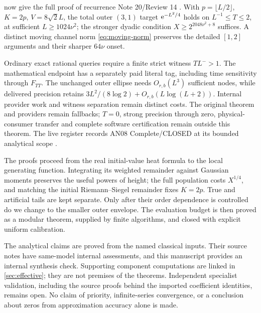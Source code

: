 \begin{remark}
\label{rem:moving-supplement}
 now give the full
proof of recurrence Note 20/Review 14 \cite{rec20,rec20review}. With
\(p=\lfloor L/2\rfloor\), \(K=2p\), \(V=8\sqrt2L\), the total
outer \((3,1)\) target \(\mathrm e^{-L^2/4}\) holds on
\(L^{-1}\le T\le2\), at sufficient \(L\ge1024\nu^2\); the stronger
dyadic condition \(X\ge2^{2048\nu^2+8}\) suffices. A distinct moving
channel norm \eqref{eq:moving-norm} preserves the detailed \([1,2]\)
arguments and their sharper \(64\nu\) onset.

Ordinary exact rational queries require a finite strict witness
\(TL^->1\). The mathematical endpoint has a separately paid literal tag,
including time sensitivity through \(F_{TT}\). The unchanged outer ellipse
needs \(O_{r,b}(L^3)\) sufficient nodes, while delivered precision retains
\(3L^2/(8\log2)+O_{r,b}(L\log(L+2))\). Internal provider work and
witness separation remain distinct costs. The original theorem and
providers remain fallbacks; \(T=0\), strong precision through zero,
physical-consumer transfer and complete software certification remain
outside this theorem. The live register records AN08 Complete/CLOSED
at its bounded analytical scope \cite{recstatus}.
\end{remark}

The proofs proceed from the real initial-value heat formula to the local
generating function. Integrating its weighted remainder against Gaussian
moments preserves the useful powers of height; the full population costs
\(X^{1/4}\), and matching the initial Riemann--Siegel remainder fixes
\(K=2p\). True and artificial tails are kept separate. Only after their
order dependence is controlled do we change to the smaller outer envelope.
The evaluation budget is then proved as a modular theorem, supplied by
finite algorithms, and closed with explicit uniform calibration.

The analytical claims are proved from the named classical inputs.
Their source notes have same-model internal assessments, and this
manuscript provides an internal synthesis check. Supporting component
computations are linked in \cref{sec:effective}; they are not premises of
the theorems. Independent specialist validation, including the source
proofs behind the imported coefficient identities, remains open.
No claim of priority, infinite-series convergence, or a conclusion about
zeros from approximation accuracy alone is made.
